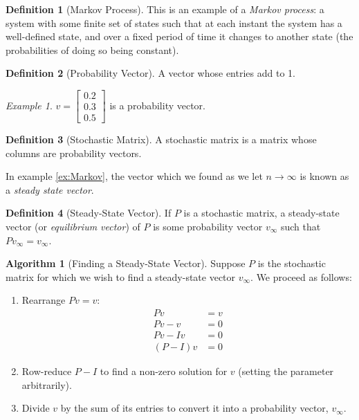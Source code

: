 \documentclass[10pt, a4paper]{amsart}
\theoremstyle{definition}
\newtheorem{defn}{Definition}
\newtheorem{alg}{Algorithm}
\theoremstyle{remark}
\newtheorem{ex}{Example}
\begin{document}
\begin{defn}[Markov Process]
  This is an example of a \emph{Markov process}: a system with some finite set of states such that at each instant the system
  has a well-defined state, and over a fixed period of time it changes to another state (the probabilities of doing so being
  constant).
\end{defn}

\begin{defn}[Probability Vector]
  A vector whose entries add to 1.
\end{defn}

\begin{ex}
  $ v = \begin{bmatrix} 0.2 \\ 0.3 \\ 0.5 \end{bmatrix} $ is a probability vector.
\end{ex}

\begin{defn}[Stochastic Matrix]
  A stochastic matrix is a matrix whose columns are probability vectors.
\end{defn}

In example \ref{ex:Markov}, the vector which we found as we let $ n \to \infty $ is known as a \emph{steady state vector}.

\begin{defn}[Steady-State Vector]
  If $ P $ is a stochastic matrix, a steady-state vector (or \emph{equilibrium vector}) of $ P $ is
  some probability vector $ v_\infty $ such that $ Pv_\infty = v_\infty $.
\end{defn}

\begin{alg}[Finding a Steady-State Vector]
  Suppose $ P $ is the stochastic matrix for which we wish to find a steady-state vector $ v_\infty $. We proceed as follows:
  \begin{enumerate}
    \item Rearrange $ Pv = v $:
      \begin{align*}
        Pv &= v\\
        Pv - v &= 0\\
        Pv - Iv &= 0\\
        (P - I)v &= 0
      \end{align*}
    \item Row-reduce $ P - I $ to find a non-zero solution for $ v $ (setting the parameter arbitrarily).
    \item Divide $ v $ by the sum of its entries to convert it into a probability vector, $ v_\infty $.
  \end{enumerate}
\end{alg}
\end{document}
